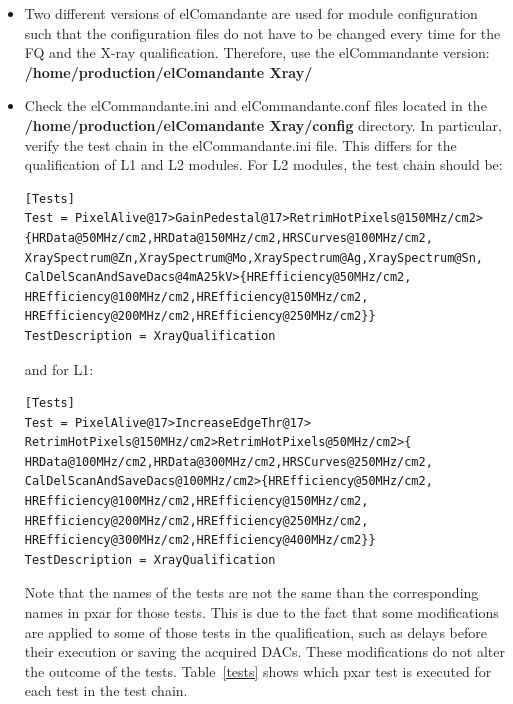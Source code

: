 \documentclass[a4paper,12pt,twoside]{article}
\begin{document}
\begin{itemize}
\item Two different versions of elComandante are used for module configuration such that the configuration files do not have to be changed every time for the FQ and the X-ray qualification. Therefore, use the elCommandante version:  \textbf{/home/production/elComandante{\color{Red} Xray}/}
\item Check the elCommandante.ini and elCommandante.conf files located in the \textbf{/home/production/elComandante{\color{Red} Xray}/config} directory. In particular, verify the test chain in the elCommandante.ini file. This differs for the qualification of L1 and L2 modules. For L2 modules, the test chain should be:

\begin{Verbatim}[frame=single]
[Tests]
Test = PixelAlive@17>GainPedestal@17>RetrimHotPixels@150MHz/cm2>
{HRData@50MHz/cm2,HRData@150MHz/cm2,HRSCurves@100MHz/cm2,
XraySpectrum@Zn,XraySpectrum@Mo,XraySpectrum@Ag,XraySpectrum@Sn,
CalDelScanAndSaveDacs@4mA25kV>{HREfficiency@50MHz/cm2,
HREfficiency@100MHz/cm2,HREfficiency@150MHz/cm2,
HREfficiency@200MHz/cm2,HREfficiency@250MHz/cm2}}
TestDescription = XrayQualification
\end{Verbatim}

and for L1:

\begin{Verbatim}[frame=single]
[Tests]
Test = PixelAlive@17>IncreaseEdgeThr@17>
RetrimHotPixels@150MHz/cm2>RetrimHotPixels@50MHz/cm2>{
HRData@100MHz/cm2,HRData@300MHz/cm2,HRSCurves@250MHz/cm2,
CalDelScanAndSaveDacs@100MHz/cm2>{HREfficiency@50MHz/cm2,
HREfficiency@100MHz/cm2,HREfficiency@150MHz/cm2,
HREfficiency@200MHz/cm2,HREfficiency@250MHz/cm2,
HREfficiency@300MHz/cm2,HREfficiency@400MHz/cm2}}
TestDescription = XrayQualification
\end{Verbatim}

Note that the names of the tests are not the same than the corresponding names in pxar for those tests. This is due to the fact that some modifications are applied to some of those tests in the qualification, such as delays before their execution or saving the acquired DACs. These modifications do not alter the outcome of the tests. 
Table~\ref{tests} shows which pxar test is executed for each test in the test chain.



\end{itemize}
\end{document}
